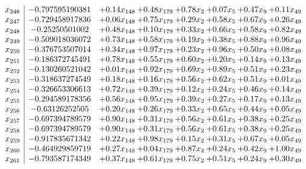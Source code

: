 \documentclass[8pt]{article}
\begin{document}
\[\begin{array}{c| c c@{\hskip 2pt} c@{\hskip 2pt} c@{\hskip 2pt} c@{\hskip 2pt} c@{\hskip 2pt} c@{\hskip 2pt} }
 x_{246}   &  -0.797595190381 & +  0.14 x_{148} & +  0.48 x_{179} & +  0.78 x_{2} & +  0.07 x_{5} & +  0.47 x_{9} & +  0.11 x_{49}\\
 x_{247}   &  -0.729458917836 & +  0.06 x_{148} & +  0.75 x_{179} & +  0.29 x_{2} & +  0.58 x_{5} & +  0.67 x_{9} & +  0.26 x_{49}\\
 x_{248}   &  -0.25250501002 & +  0.48 x_{148} & +  0.10 x_{179} & +  0.33 x_{2} & +  0.66 x_{5} & +  0.58 x_{9} & +  0.82 x_{49}\\
 x_{249}   &  -0.509018036072 & +  0.73 x_{148} & +  0.58 x_{179} & +  0.19 x_{2} & +  0.38 x_{5} & +  0.88 x_{9} & +  0.96 x_{49}\\
 x_{250}   &  -0.376753507014 & +  0.34 x_{148} & +  0.97 x_{179} & +  0.23 x_{2} & +  0.96 x_{5} & +  0.50 x_{9} & +  0.08 x_{49}\\
 x_{251}   &  -0.186372745491 & +  0.78 x_{148} & +  0.55 x_{179} & +  0.60 x_{2} & +  0.20 x_{5} & +  0.14 x_{9} & +  0.13 x_{49}\\
 x_{252}   &  -0.130260521042 & +  0.01 x_{148} & +  0.92 x_{179} & +  0.69 x_{2} & +  0.89 x_{5} & +  0.51 x_{9} & +  0.23 x_{49}\\
 x_{253}   &  -0.318637274549 & +  0.18 x_{148} & +  0.16 x_{179} & +  0.56 x_{2} & +  0.62 x_{5} & +  0.51 x_{9} & +  0.01 x_{49}\\
 x_{254}   &  -0.326653306613 & +  0.72 x_{148} & +  0.39 x_{179} & +  0.12 x_{2} & +  0.24 x_{5} & +  0.46 x_{9} & +  0.14 x_{49}\\
 x_{255}   &  -0.294589178356 & +  0.56 x_{148} & +  0.95 x_{179} & +  0.39 x_{2} & +  0.27 x_{5} & +  0.17 x_{9} & +  0.13 x_{49}\\
 x_{256}   &  -0.63126252505 & +  0.20 x_{148} & +  0.26 x_{179} & +  0.33 x_{2} & +  0.65 x_{5} & +  0.44 x_{9} & +  0.05 x_{49}\\
 x_{257}   &  -0.697394789579 & +  0.90 x_{148} & +  0.31 x_{179} & +  0.56 x_{2} & +  0.61 x_{5} & +  0.38 x_{9} & +  0.25 x_{49}\\
 x_{258}   &  -0.697394789579 & +  0.90 x_{148} & +  0.31 x_{179} & +  0.56 x_{2} & +  0.61 x_{5} & +  0.38 x_{9} & +  0.25 x_{49}\\
 x_{259}   &  -0.917835671342 & +  0.22 x_{148} & +  0.98 x_{179} & +  0.15 x_{2} & +  0.31 x_{5} & +  0.67 x_{9} & +  0.05 x_{49}\\
 x_{260}   &  -0.464929859719 & +  0.27 x_{148} & +  0.04 x_{179} & +  0.87 x_{2} & +  0.24 x_{5} & +  0.42 x_{9} & +  1.00 x_{49}\\
 x_{261}   &  -0.793587174349 & +  0.37 x_{148} & +  0.61 x_{179} & +  0.75 x_{2} & +  0.51 x_{5} & +  0.24 x_{9} & +  0.30 x_{49}\\

\end{array}\]
\end{document}
